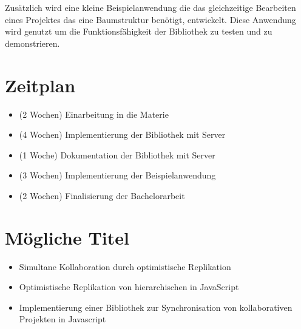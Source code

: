 \documentclass[pdftex,12pt,a4paper]{article}
\begin{document}
Zusätzlich wird eine kleine Beispielanwendung die das gleichzeitige Bearbeiten eines Projektes das eine Baumstruktur benötigt, entwickelt. Diese Anwendung wird genutzt um die Funktionsfähigkeit der Bibliothek zu testen und zu demonstrieren.\\

\section{Zeitplan}

\begin{itemize}

\item (2 Wochen) Einarbeitung in die Materie\\
\item (4 Wochen) Implementierung der Bibliothek mit Server\\
\item (1 Woche) Dokumentation der Bibliothek mit Server\\
\item (3 Wochen) Implementierung der Beispielanwendung\\
\item (2 Wochen) Finalisierung der Bachelorarbeit\\

\end{itemize}

\section{Mögliche Titel}
\begin{itemize}

\item Simultane Kollaboration durch optimistische Replikation\\
\item Optimistische Replikation von hierarchischen in JavaScript \\
\item Implementierung einer Bibliothek zur Synchronisation von kollaborativen Projekten in Javascript\\

\end{itemize}
\end{document}
